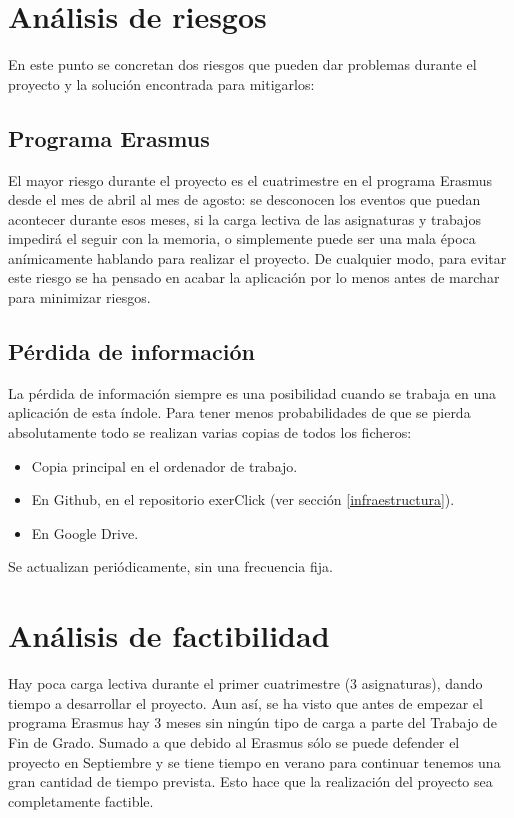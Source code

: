 \section{Análisis de riesgos}

En este punto se concretan dos riesgos que pueden dar problemas durante el proyecto y la solución encontrada para mitigarlos:\\

\subsection*{Programa Erasmus}

El mayor riesgo durante el proyecto es el cuatrimestre en el programa Erasmus desde el mes de abril al mes de agosto: se desconocen los eventos que puedan acontecer durante esos meses, si la carga lectiva de las asignaturas y trabajos impedirá el seguir con la memoria, o simplemente puede ser una mala época anímicamente hablando para realizar el proyecto. De cualquier modo, para evitar este riesgo se ha pensado en acabar la aplicación por lo menos antes de marchar para minimizar riesgos.\\

\subsection*{Pérdida de información}

La pérdida de información siempre es una posibilidad cuando se trabaja en una aplicación de esta índole. Para tener menos probabilidades de que se pierda absolutamente todo se realizan varias copias de todos los ficheros:

\begin{itemize}
\item Copia principal en el ordenador de trabajo.
\item En Github, en el repositorio exerClick (ver sección \ref{infraestructura}).
\item En Google Drive.
\end{itemize}

Se actualizan periódicamente, sin una frecuencia fija.\\


\section{Análisis de factibilidad}

Hay poca carga lectiva durante el primer cuatrimestre (3 asignaturas), dando tiempo a desarrollar el proyecto. Aun así, se ha visto que antes de empezar el programa Erasmus hay 3 meses sin ningún tipo de carga a parte del Trabajo de Fin de Grado. Sumado a que debido al Erasmus sólo se puede defender el proyecto en Septiembre y se tiene tiempo en verano para continuar tenemos una gran cantidad de tiempo prevista. Esto hace que la realización del proyecto sea completamente factible.\\